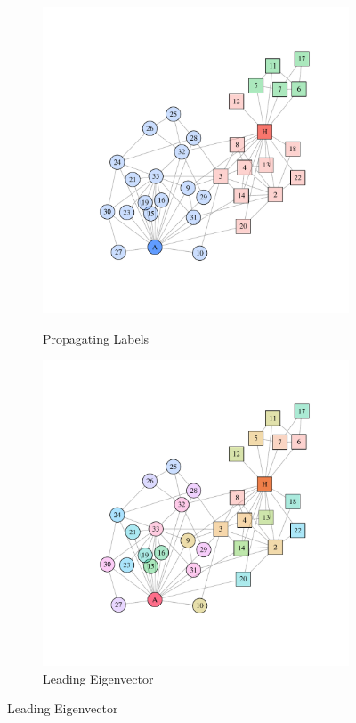 \begin{figure}
\begin{subfigure}[b]{0.32\textwidth}
\caption{Propagating Labels}
\includegraphics[width=\textwidth,trim={0.75in 0.75in 0.75in 0.75in}, clip=True]{label_prop.pdf}
\label{fig:label_prop}
\end{subfigure}
\hfill
\begin{subfigure}[b]{0.32\textwidth}
\caption{Leading Eigenvector}
\includegraphics[width=\textwidth,trim={0.75in 0.75in 0.75in 0.75in}, clip=True]{leading_eigen.pdf}

\end{subfigure}
\end{figure}
